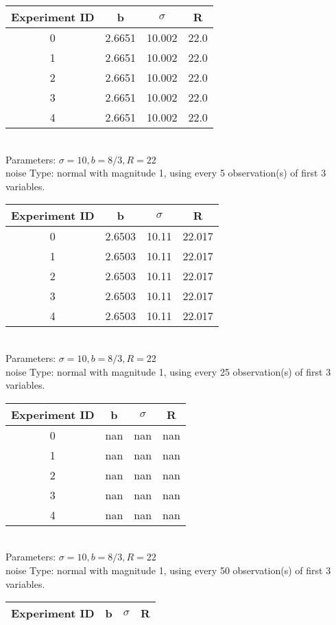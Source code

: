 \begin{multicols}{3}
\begin{tabular}{cccc}
\hline Experiment ID & b & $\sigma$ & R \\ \hline 
0 & 2.6651 & 10.002 & 22.0\\ \hline 
 1 & 2.6651 & 10.002 & 22.0\\ \hline 
 2 & 2.6651 & 10.002 & 22.0\\ \hline 
 3 & 2.6651 & 10.002 & 22.0\\ \hline 
 4 & 2.6651 & 10.002 & 22.0\\ \hline 
 \end{tabular}\\
Parameters: $\sigma=10, b=8/3, R=22$\\
noise Type: normal with magnitude 1, using every 5 observation(s) of first 3 variables.\\
\begin{tabular}{cccc}
\hline Experiment ID & b & $\sigma$ & R \\ \hline 
0 & 2.6503 & 10.11 & 22.017\\ \hline 
 1 & 2.6503 & 10.11 & 22.017\\ \hline 
 2 & 2.6503 & 10.11 & 22.017\\ \hline 
 3 & 2.6503 & 10.11 & 22.017\\ \hline 
 4 & 2.6503 & 10.11 & 22.017\\ \hline 
 \end{tabular}\\
Parameters: $\sigma=10, b=8/3, R=22$\\
noise Type: normal with magnitude 1, using every 25 observation(s) of first 3 variables.\\
\begin{tabular}{cccc}
\hline Experiment ID & b & $\sigma$ & R \\ \hline 
0 & nan & nan & nan\\ \hline 
 1 & nan & nan & nan\\ \hline 
 2 & nan & nan & nan\\ \hline 
 3 & nan & nan & nan\\ \hline 
 4 & nan & nan & nan\\ \hline 
 \end{tabular}\\
Parameters: $\sigma=10, b=8/3, R=22$\\
noise Type: normal with magnitude 1, using every 50 observation(s) of first 3 variables.\\
\begin{tabular}{cccc}
\hline Experiment ID & b & $\sigma$ & R \\ \hline 

\end{tabular}
\end{multicols}
